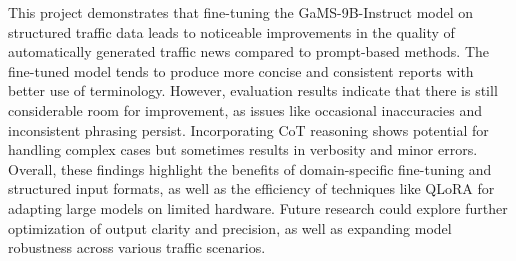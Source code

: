 \documentclass[fleqn,moreauthors,10pt]{ds_report}
\begin{document}
This project demonstrates that fine-tuning the GaMS-9B-Instruct model on structured traffic data leads to noticeable improvements in the quality of automatically generated traffic news compared to prompt-based methods. The fine-tuned model tends to produce more concise and consistent reports with better use of terminology. However, evaluation results indicate that there is still considerable room for improvement, as issues like occasional inaccuracies and inconsistent phrasing persist. Incorporating CoT reasoning shows potential for handling complex cases but sometimes results in verbosity and minor errors. Overall, these findings highlight the benefits of domain-specific fine-tuning and structured input formats, as well as the efficiency of techniques like QLoRA for adapting large models on limited hardware. Future research could explore further optimization of output clarity and precision, as well as expanding model robustness across various traffic scenarios.


\end{document}

